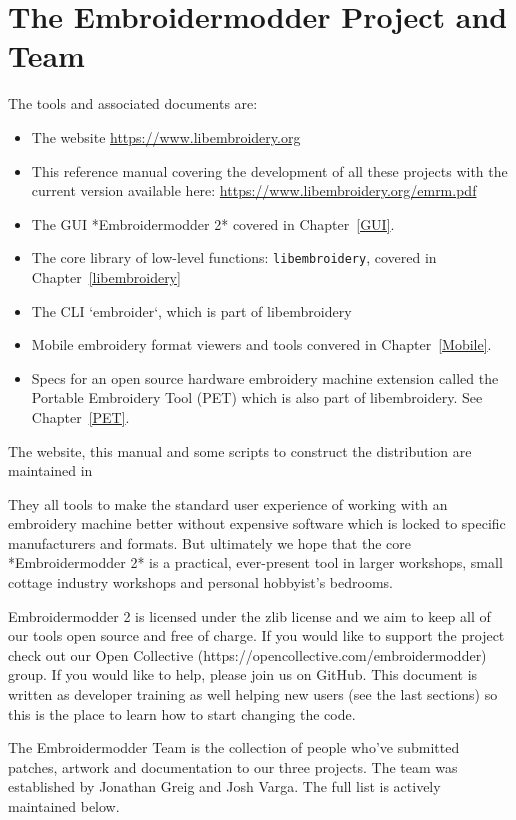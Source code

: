 \documentclass[10pt]{report}
\begin{document}
\section{The Embroidermodder Project and Team}

The tools and associated documents are:

\begin{itemize}
\item The website \url{https://www.libembroidery.org}
\item This reference manual covering the development of all these projects with
the current version available here: \url{https://www.libembroidery.org/emrm.pdf}
\item The GUI *Embroidermodder 2* covered in Chapter~\ref{GUI}.
\item The core library of low-level functions: \texttt{libembroidery}, covered in
Chapter~\ref{libembroidery}
\item The CLI `embroider`, which is part of libembroidery
\item Mobile embroidery format viewers and tools convered in Chapter~\ref{Mobile}.
\item Specs for an open source hardware embroidery machine extension called the
Portable Embroidery Tool (PET) which is also part of libembroidery.
See Chapter~\ref{PET}.
\end{itemize}

The website, this manual and some scripts to construct the distribution are
maintained in %

They all tools to make the standard
user experience of working with an embroidery machine better without expensive
software which is locked to specific manufacturers and formats. But ultimately
we hope that the core *Embroidermodder 2* is a practical, ever-present tool in
larger workshops, small cottage industry workshops and personal hobbyist's
bedrooms.

Embroidermodder 2 is licensed under the zlib license and we aim to keep all of our tools open
source and free of charge. If you would like to support the project check out our  Open
Collective (https://opencollective.com/embroidermodder) group.
If you would like to help,
please join us on GitHub. This document is written as developer training as well helping new
users (see the last sections) so this is the place to learn how to start changing the code.

The Embroidermodder Team is the collection of people who've submitted
patches, artwork and documentation to our three projects.
The team was established by Jonathan Greig and Josh Varga.
The full list is actively maintained below.
\end{document}
